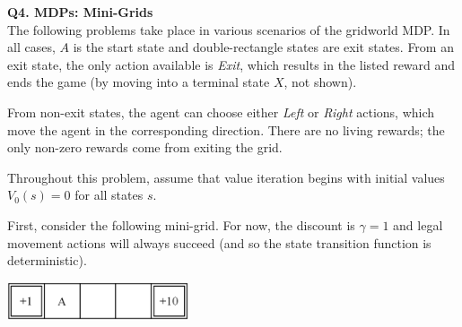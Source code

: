\textbf{Q4. MDPs: Mini-Grids}  \\

The following problems take place in various scenarios of the gridworld MDP.
In all cases, $A$ is the start state and double-rectangle states are exit states.
From an exit state, the only action available is \emph{Exit}, which results in the listed reward and ends the game (by moving into a terminal state $X$, not shown).

From non-exit states, the agent can choose either \emph{Left} or \emph{Right} actions, which move the agent in the corresponding direction.
There are no living rewards; the only non-zero rewards come from exiting the grid.

Throughout this problem, assume that value iteration begins with initial values $V_0(s) = 0$ for all states $s$.

First, consider the following mini-grid.
For now, the discount is $\gamma = 1$ and legal movement actions will always succeed (and so the state transition function is deterministic).

\begin{center}
\centering
\includegraphics[width=0.4\textwidth]{figures/minigrid-discount.png}
\end{center}

